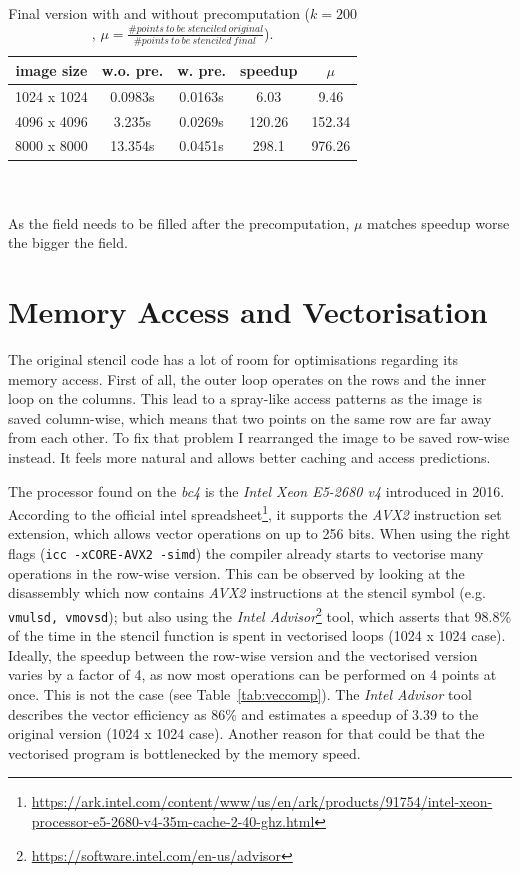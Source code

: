 \documentclass[letterpaper,twocolumn,10pt]{article}
\begin{document}
\begin{table}[ht]
	\caption{Final version with and without precomputation ($k=200$, $\mu = \frac{\#points\ to\ be\ stenciled\ original}{\#points\ to\ be\ stenciled\ final\ }$).}
	\begin{tabular}{c c c c c}
		image size    & w.o. pre. & w. pre. & speedup & $\mu$  \\
		\hline
		1024 x 1024 & 0.0983s  & 0.0163s & 6.03 & 9.46\\
		4096 x 4096 & 3.235s  & 0.0269s & 120.26 & 152.34\\
		8000 x 8000 & 13.354s & 0.0451s  & 298.1 & 976.26\\
	\end{tabular}
	\label{tab:prec}
	\\\\
	As the field needs to be filled after the precomputation, $\mu$ matches speedup worse the bigger the field.
\end{table}


\section*{Memory Access and Vectorisation}
The original stencil code has a lot of room for optimisations regarding its memory access.
First of all, the outer loop operates on the rows and the inner loop on the columns.
This lead to a spray-like access patterns as the image is saved column-wise, which means
that two points on the same row are far away from each other.
To fix that problem I rearranged the image to be saved row-wise instead. It feels more
natural and allows better caching and access predictions.


The processor found on the \textit{bc4} is the \textit{Intel Xeon E5-2680 v4} introduced in 2016.
According to the official intel spreadsheet\footnote{\url{https://ark.intel.com/content/www/us/en/ark/products/91754/intel-xeon-processor-e5-2680-v4-35m-cache-2-40-ghz.html}},
it supports the \textit{AVX2} instruction set extension, which allows vector operations on up to 256 bits.
When using the right flags (\texttt{icc -xCORE-AVX2 -simd}) the compiler already starts to vectorise many operations in the row-wise version.
This can be observed by looking at the disassembly which now contains \textit{AVX2} instructions
at the stencil symbol (e.g. \texttt{vmulsd, vmovsd}); but also using the \textit{Intel Advisor}\footnote{\url{https://software.intel.com/en-us/advisor}} tool,
which asserts that 98.8\% of the time in the stencil function is spent in vectorised loops (1024 x 1024 case).
Ideally, the speedup between the row-wise version and the vectorised version varies by a factor of 4,
as now most operations can be performed on 4 points at once.
This is not the case (see Table~\ref{tab:veccomp}). The \textit{Intel Advisor} tool describes the vector
efficiency as 86\% and estimates a speedup of 3.39 to the original version (1024 x 1024 case). Another
reason for that could be that the vectorised program is bottlenecked by the memory speed.
\end{document}
